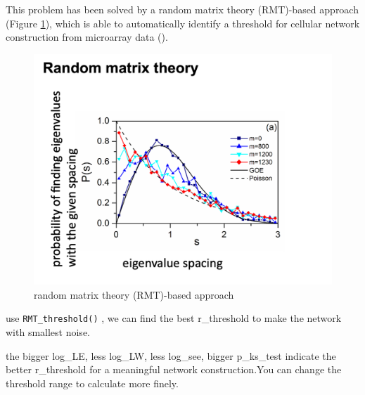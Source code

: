 \documentclass[
]{book}
\begin{document}
This problem has been solved by a random matrix theory (RMT)-based approach (Figure \ref{fig:RMT}), which is able to automatically identify a threshold for cellular network construction from microarray data (\citet{dengMolecularEcologicalNetwork2012}).

\begin{figure}
\includegraphics[width=5.59in]{images/2-1.RMT} \caption{random matrix theory (RMT)-based approach}\label{fig:RMT}
\end{figure}

use \texttt{RMT\_threshold()} , we can find the best r\_threshold to make the network with smallest noise.

the bigger log\_LE, less log\_LW, less log\_see, bigger p\_ks\_test indicate the better r\_threshold for a meaningful network construction.You can change the threshold range to calculate more finely.
\end{document}
